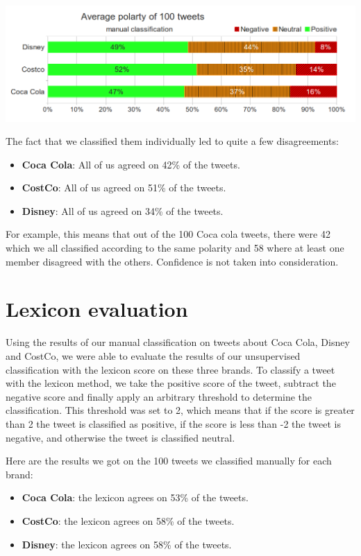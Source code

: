\documentclass[a4paper,12pt]{report}
\begin{document}
\centerline{\includegraphics[scale=0.55]{../img/man1.png}}

The fact that we classified them individually led to quite a few disagreements:

\begin{itemize}
        \item \textbf{Coca Cola}: All of us agreed on 42\% of the tweets.
        \item \textbf{CostCo}: All of us agreed on 51\% of the tweets.
        \item \textbf{Disney}: All of us agreed on 34\% of the tweets.
\end{itemize}

For example, this means that out of the 100 Coca cola tweets, there were 42 which we all classified according to the same polarity and 58 where at least one member disagreed with the others. Confidence is not taken into consideration.

\section{Lexicon evaluation}

Using the results of our manual classification on tweets about Coca Cola, Disney and CostCo, we were able to evaluate the results of our unsupervised classification with the lexicon score on these three brands.
To classify a tweet with the lexicon method, we take the positive score of the tweet, subtract the negative score and finally apply an arbitrary threshold to determine the classification.
This threshold was set to 2, which means that if the score is greater than 2 the tweet is classified as positive, if the score is less than -2 the tweet is negative, and otherwise the tweet is classified neutral.

Here are the results we got on the 100 tweets we classified manually for each brand:
\begin{itemize}
        \item \textbf{Coca Cola}: the lexicon agrees on 53\% of the tweets.
        \item \textbf{CostCo}: the lexicon agrees on 58\% of the tweets.
        \item \textbf{Disney}: the lexicon agrees on 58\% of the tweets.
\end{itemize}
\end{document}
